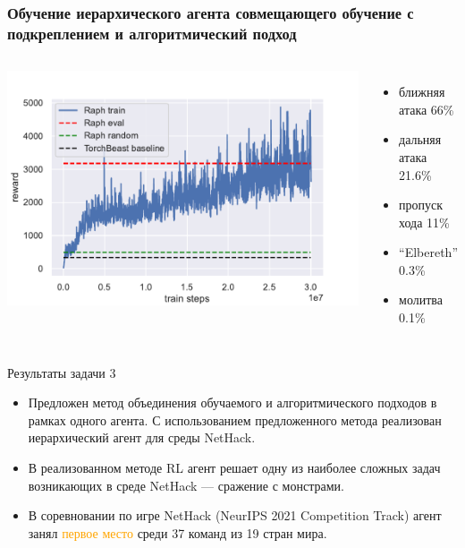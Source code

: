 \begin{frame}
\frametitle{Обучение иерархического агента совмещающего обучение с подкреплением и алгоритмический подход}
\begin{columns}
\centering
\includegraphics[width=1\linewidth]{images/raph_train.pdf}
\begin{itemize}
    \item ближняя атака 66\%
    \item дальняя атака 21.6\%
    \item пропуск хода 11\%
    \item ``Elbereth'' 0.3\%
    \item молитва 0.1\%
\end{itemize}
\end{columns}
\end{frame}


\begin{frame}{Результаты задачи 3}
\begin{itemize}
    \item[\textcolor{ForestGreen}{\checkmark}] Предложен метод объединения обучаемого и алгоритмического подходов в рамках одного агента. С использованием предложенного метода реализован иерархический агент для среды NetHack.
    \item[\textcolor{ForestGreen}{\checkmark}] В реализованном методе RL агент решает одну из наиболее сложных задач возникающих в среде NetHack — сражение с монстрами.
    \item[\textcolor{ForestGreen}{\checkmark}] В соревновании по игре NetHack (NeurIPS 2021 Competition Track) агент занял \textcolor{orange}{первое место} среди 37 команд из 19 стран мира.
\end{itemize}
    
\end{frame}

